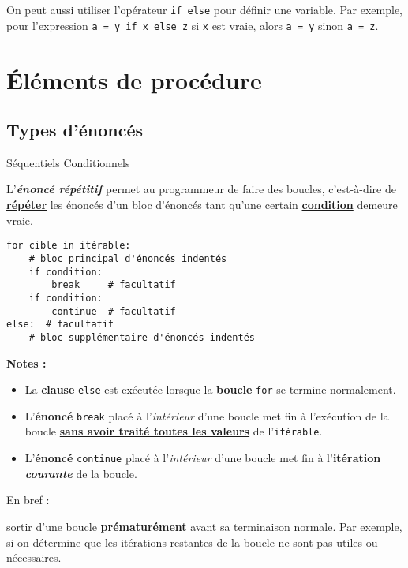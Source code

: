 \documentclass[10pt, french]{article}
\begin{document}
\begin{multicols*}{2}
On peut aussi utiliser l'opérateur \texttt{if else} pour définir une variable. Par exemple, pour l'expression \texttt{a = y if x else z} si \texttt{x} est vraie, alors \texttt{a = y} sinon \texttt{a = z}.



\newpage
\section{Éléments de procédure}
\subsection{Types d'énoncés}
Séquentiels
Conditionnels
\begin{definitionNOHFILL}
L'\textbf{\textit{énoncé répétitif}} permet au programmeur de faire des boucles, c'est-à-dire de \textbf{\underline{répéter}} les énoncés d'un bloc d'énoncés tant qu'une certain \textbf{\underline{condition}} demeure vraie.
\end{definitionNOHFILL}

\begin{definitionNOHFILLsub}
\begin{lstlisting}
for cible in itérable:
    # bloc principal d'énoncés indentés
    if condition: 
        break     # facultatif
    if condition: 
        continue  # facultatif
else:  # facultatif
    # bloc supplémentaire d'énoncés indentés
\end{lstlisting}

\textbf{Notes :}
\begin{itemize}
	\item	La \textbf{clause} \texttt{else} est exécutée lorsque la \textbf{boucle} \texttt{for} se termine normalement.
	\item	L'\textbf{énoncé} \texttt{break} placé à l'\textit{intérieur} d'une boucle met fin à l'exécution de la boucle \underline{\textbf{sans avoir traité toutes les valeurs}} de l'\texttt{itérable}.
	\item	L'\textbf{énoncé} \texttt{continue} placé à l'\textit{intérieur} d'une boucle met fin à l'\textbf{itération \textit{courante}} de la boucle.
\end{itemize} 
\end{definitionNOHFILLsub}

En bref : 
\begin{description}[font = \ttfamily]
	\item[break]	sortir d'une boucle \textbf{prématurément} avant sa terminaison normale. Par exemple, si on détermine que les itérations restantes de la boucle ne sont pas utiles ou nécessaires.
	\item[continue]
\end{description}



\end{multicols*}
\end{document}
